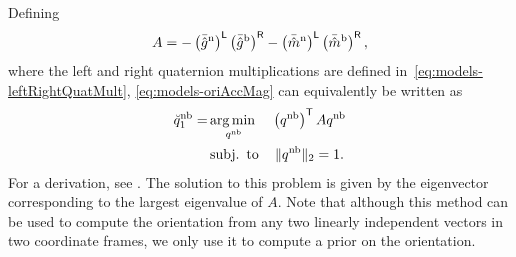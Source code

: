 Defining 
\begin{align}
A = - \left( \bar{\hat{g}}^\text{n} \right)^{\mathsf{L}} \left( \bar{\hat{g}}^\text{b} \right)^{\mathsf{R}} - \left( \bar{\hat{m}}^\text{n} \right)^{\mathsf{L}} \left( \bar{\hat{m}}^\text{b} \right)^{\mathsf{R}},
\end{align}
where the left and right quaternion multiplications are defined in~\eqref{eq:models-leftRightQuatMult}, \eqref{eq:models-oriAccMag} can equivalently be written as 
\begin{align}
\breve{q}^\text{nb}_1 = &\operatorname*{arg \, min \,}_{q^\text{nb}} \quad \left( q^\text{nb} \right)^{\mathsf{T}} A q^\text{nb} \nonumber \\
&\operatorname*{subj. \ to} \quad \| q^\text{nb} \|_2 = 1.
\label{eq:models-oriAccMagReform}
\end{align}
For a derivation, see \cite{hol:2011}. The solution to this problem is given by the eigenvector corresponding to the largest eigenvalue of $A$. Note that although this method can be used to compute the orientation from any two linearly independent vectors in two coordinate frames, we only use it to compute a prior on the orientation. 

